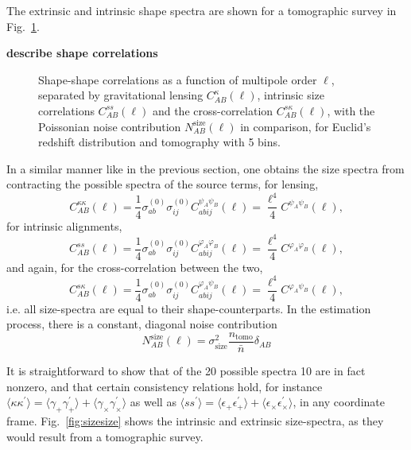 \documentclass[a4paper,fleqn,usenatbib]{mnras}
\def\spirou#1{{\bf #1}}
\newcommand{\bra}{\langle}
\newcommand{\ket}{\rangle}
\begin{document}
The extrinsic and intrinsic shape spectra are shown for a tomographic survey in Fig.~\ref{fig:shapeshape}.

\spirou{describe shape correlations}


\begin{figure}
\centering
\caption{Shape-shape correlations as a function of multipole order $\ell$, separated by gravitational lensing $C_{AB}^{\kappa}(\ell)$, intrinsic size correlations $C_{AB}^{ss}(\ell)$ and the cross-correlation $C_{AB}^{s\kappa}(\ell)$, with the Poissonian noise contribution $N_{AB}^\mathrm{size}(\ell)$ in comparison, for Euclid's redshift distribution and tomography with 5 bins.}
\label{fig:shapeshape}
\end{figure}

In a similar manner like in the previous section, one obtains the size spectra from contracting the possible spectra of the source terms, for lensing,
\begin{equation}
C^{\kappa\kappa}_{AB}(\ell) = \frac{1}{4}\sigma^{(0)}_{ab}\sigma^{(0)}_{ij}C^{\psi_A\psi_B}_{abij}(\ell) = \frac{\ell^4}{4}C^{\psi_A\psi_B}(\ell),
\end{equation}
for intrinsic alignments,
\begin{equation}
C^{ss}_{AB}(\ell) = \frac{1}{4}\sigma^{(0)}_{ab}\sigma^{(0)}_{ij}C^{\varphi_A\varphi_B}_{abij}(\ell) = \frac{\ell^4}{4}C^{\varphi_A\varphi_B}(\ell),
\end{equation}
and again, for the cross-correlation between the two,
\begin{equation}
C^{s\kappa}_{AB}(\ell) = \frac{1}{4}\sigma^{(0)}_{ab}\sigma^{(0)}_{ij}C^{\varphi_A\psi_B}_{abij}(\ell) = \frac{\ell^4}{4}C^{\varphi_A\psi_B}(\ell),
\end{equation}
i.e. all size-spectra are equal to their shape-counterparts. In the estimation process, there is a constant, diagonal noise contribution
\begin{equation}
N_{AB}^\mathrm{size}(\ell) = \sigma^2_\mathrm{size} \frac{n_\mathrm{tomo}}{\bar{n}}\delta_{AB}
\end{equation}

It is straightforward to show that of the 20 possible spectra 10 are in fact nonzero, and that certain consistency relations hold, for instance $\bra\kappa\kappa^\prime\ket = \bra\gamma_+\gamma_+^\prime\ket + \bra\gamma_\times\gamma_\times^\prime\ket$ as well as $\bra ss^\prime\ket = \bra\epsilon_+\epsilon_+^\prime\ket + \bra\epsilon_\times\epsilon_\times^\prime\ket$, in any coordinate frame. Fig.~\ref{fig:sizesize} shows the intrinsic and extrinsic size-spectra, as they would result from a tomographic survey.
\end{document}

